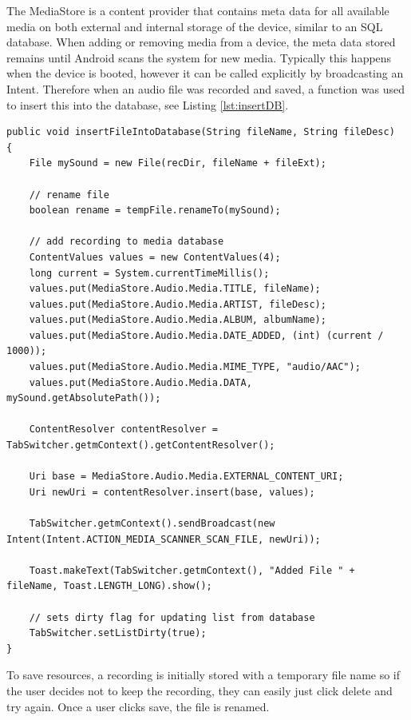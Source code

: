 \documentclass[conference]{acmsiggraph}
\begin{document}
The MediaStore is a content provider that contains meta data for all available media on both external and internal storage of the device, similar to an SQL database. When adding or removing media from a device, the meta data stored remains until Android scans the system for new media. Typically this happens when the device is booted, however it can be called explicitly by broadcasting an Intent. \cite{MediaStore} Therefore when an audio file was recorded and saved, a function was used to insert this into the database, see Listing \ref{lst:insertDB}.


\begin{lstlisting}[label = {lst:insertDB}, caption={Inserting File into MediaStore Database}]
public void insertFileIntoDatabase(String fileName, String fileDesc)
{
    File mySound = new File(recDir, fileName + fileExt);
    	
    // rename file
    boolean rename = tempFile.renameTo(mySound);
    	
   	// add recording to media database
   	ContentValues values = new ContentValues(4);
   	long current = System.currentTimeMillis();
   	values.put(MediaStore.Audio.Media.TITLE, fileName);
   	values.put(MediaStore.Audio.Media.ARTIST, fileDesc);
   	values.put(MediaStore.Audio.Media.ALBUM, albumName);
   	values.put(MediaStore.Audio.Media.DATE_ADDED, (int) (current / 1000));
    values.put(MediaStore.Audio.Media.MIME_TYPE, "audio/AAC");
   	values.put(MediaStore.Audio.Media.DATA, mySound.getAbsolutePath());
    	
   	ContentResolver contentResolver = TabSwitcher.getmContext().getContentResolver();
    	
   	Uri base = MediaStore.Audio.Media.EXTERNAL_CONTENT_URI;
   	Uri newUri = contentResolver.insert(base, values);
    	
   	TabSwitcher.getmContext().sendBroadcast(new Intent(Intent.ACTION_MEDIA_SCANNER_SCAN_FILE, newUri));
   	
   	Toast.makeText(TabSwitcher.getmContext(), "Added File " + fileName, Toast.LENGTH_LONG).show();
    	
   	// sets dirty flag for updating list from database
   	TabSwitcher.setListDirty(true);
}
\end{lstlisting}

To save resources, a recording is initially stored with a temporary file name so if the user decides not to keep the recording, they can easily just click delete and try again. Once a user clicks save, the file is renamed.
\end{document}
